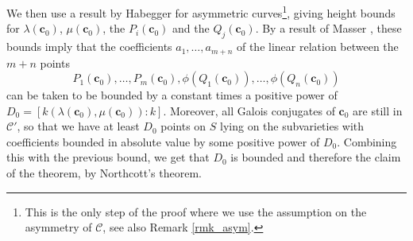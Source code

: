 \documentclass[11pt,a4paper,reqno]{amsart}
\numberwithin{equation}{section}
\renewcommand{\c}{\mathcal{C}}
\newcommand{\cc}{\mathbf{c}}
\renewcommand{\l}{\lambda}
\newcommand{\m}{\mu}
\newcommand{\pq}[1]{\left[ #1 \right]}
\theoremstyle{remark}
\theoremstyle{definition}
\theoremstyle{definition}
\begin{document}
We then use a result by Habegger \cite{Hab10} for asymmetric curves\footnote{This is the only step of the proof where we use the assumption on the asymmetry of $\c$, see also Remark \ref{rmk_asym}.}, giving height bounds for $\l(\cc_0)$, $\m(\cc_0)$, the $P_i(\cc_0)$ and the $Q_j(\cc_0)$. 
By a result of Masser \cite{Mas88}, these bounds imply that the coefficients $a_1, \ldots, a_{m+n}$ of the linear relation between  the $m+n$ points 
$$P_1(\cc_0), \ldots, P_m(\cc_0), \phi(Q_1(\cc_0)), \ldots, \phi(Q_n(\cc_0))$$
can be taken to be bounded by a constant times a positive power of $D_0=\pq{k(\l(\cc_0),\m(\cc_0)):k}$. Moreover, all Galois conjugates of $\cc_0$ are still in $\c'$, so that we have at least $D_0$ points on $S$ lying on the subvarieties with coefficients bounded in absolute value by some positive power of $D_0$. Combining this with the previous bound, we get that $D_0$ is bounded and therefore the claim of the theorem, by Northcott's theorem.
\end{document}
